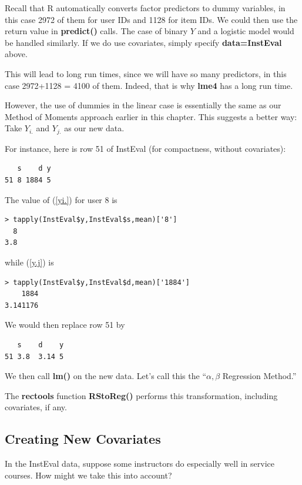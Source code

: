 Recall that R automatically converts factor predictors to dummy
variables, in this case 2972 of them for user IDs and 1128 for item IDs.
We could then use the return value in \textbf{predict()} calls.
The case of binary $Y$ and a logistic model would be handled similarly.
If we do use covariates, simply specify \textbf{data=InstEval} above.

This will lead to long run times, since we will have so many predictors,
in this case 2972+1128 = 4100 of them.  Indeed, that is why \textbf{lme4}
has a long run time.

However, the use of dummies in the linear case is essentially the same
as our Method of Moments approach earlier in this chapter.  This
suggests a better way:  Take $Y_{i.}$ and $Y_{j.}$
as our new data.

For instance, here is row 51 of InstEval (for compactness,
without covariates):

\begin{lstlisting}
   s    d y 
51 8 1884 5       
\end{lstlisting}

The value of (\ref{yi.}) for user 8 is

\begin{lstlisting}
> tapply(InstEval$y,InstEval$s,mean)['8']
  8 
3.8 
\end{lstlisting}

while (\ref{y.j}) is

\begin{lstlisting}
> tapply(InstEval$y,InstEval$d,mean)['1884']
    1884 
3.141176 
\end{lstlisting}

We would then replace row 51 by

\begin{lstlisting}
   s    d    y 
51 3.8  3.14 5       
\end{lstlisting}

We then call \textbf{lm()} on the new data.  Let's call this the
``$\alpha,\beta$ Regression Method.''

The \textbf{rectools} function \textbf{RStoReg()} performs this
transformation, including covariates, if any.

\subsection{Creating New Covariates}

In the InstEval data, suppose some instructors do especially well in
service courses.  How might we take this into account?

